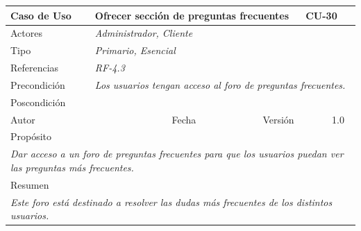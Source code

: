 \begin{table}[H]
    \begin{tabular}{|llllllll|}
    \hline
    \multicolumn{1}{|l|}{Caso de Uso}  & \multicolumn{5}{l|}{Ofrecer sección de preguntas frecuentes}                                       & \multicolumn{2}{l|}{\cellcolor[HTML]{E6E6E6}CU-30}  \\ \hline
    \multicolumn{1}{|l|}{Actores}      & \multicolumn{7}{l|}{{\color[HTML]{808080} \textit{Administrador, Cliente}}}                                                                              \\ \hline
    \multicolumn{1}{|l|}{Tipo}         & \multicolumn{7}{l|}{{\color[HTML]{808080} \textit{Primario, Esencial}}}                                                                                  \\ \hline
    \multicolumn{1}{|l|}{Referencias}  & \multicolumn{2}{l|}{{\color[HTML]{808080} \textit{RF-4.3}}}    & \multicolumn{5}{l|}{}                                                                   \\ \hline
    \multicolumn{1}{|l|}{Precondición} & \multicolumn{7}{l|}{{\color[HTML]{808080} \textit{Los usuarios tengan acceso al foro de preguntas frecuentes.}}}                                         \\ \hline
    \multicolumn{1}{|l|}{Poscondición} & \multicolumn{7}{l|}{}                                                                                                                                    \\ \hline
    \multicolumn{1}{|l|}{Autor}        & \multicolumn{1}{l|}{}                   & \multicolumn{2}{l|}{Fecha} & \multicolumn{1}{l|}{}  & \multicolumn{2}{l|}{Versión} & 1.0                       \\ \hline
    \multicolumn{8}{|l|}{\cellcolor[HTML]{F2F2F2}Propósito}                                                                                                                              \\ \hline
    \multicolumn{8}{|p{15cm}|}{{\color[HTML]{808080} \textit{Dar acceso a un foro de preguntas frecuentes para que los usuarios puedan ver las preguntas más frecuentes.}}}                             \\ \hline
    \multicolumn{8}{|l|}{\cellcolor[HTML]{F2F2F2}Resumen}                                                                                                                                         \\ \hline
    \multicolumn{8}{|p{15cm}|}{{\color[HTML]{808080} \textit{Este foro está destinado a resolver las dudas más frecuentes de los distintos usuarios.}}}                                                 \\ \hline
    \end{tabular}
    \end{table}



